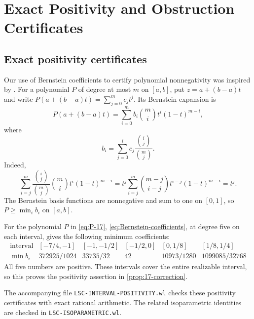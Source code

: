 \section[Positivity and Obstruction Certificates]{Exact Positivity and Obstruction Certificates}
\label{app:exact-certificates}

\subsection{Exact positivity certificates}
\label{subsec:legacy-exact-certificates}

Our use of Bernstein coefficients to certify polynomial nonnegativity
was inspired by \cite[Section~6.3 and Appendix~A]{LienTsai26}.
For a polynomial \(P\) of degree at most \(m\) on \([a,b]\), put
\(z=a+(b-a)t\) and write \(P(a+(b-a)t)=\sum_{j=0}^m c_jt^j\).
Its Bernstein expansion is
\begin{equation}\label{eq:Bernstein-expansion}
 P(a+(b-a)t)=\sum_{i=0}^m b_i\binom mi t^i(1-t)^{m-i},
\end{equation}
where
\begin{equation}\label{eq:Bernstein-coefficients}
 b_i=\sum_{j=0}^i c_j\frac{\binom ij}{\binom mj}.
\end{equation}
Indeed,
\[
 \sum_{i=j}^m\frac{\binom ij}{\binom mj}\binom mi t^i(1-t)^{m-i}
 =t^j\sum_{i=j}^m\binom{m-j}{i-j}t^{i-j}(1-t)^{m-i}=t^j.
\]
The Bernstein basis functions are nonnegative and sum to one on
\([0,1]\), so \(P\geq\min_i b_i\) on \([a,b]\).

\begin{example}
\label{ex:Bernstein-17}
For the polynomial \(P\) in \eqref{eq:P-17}, \eqref{eq:Bernstein-coefficients}, at degree five on each interval,
gives the following minimum coefficients:
\[
\begin{array}{c|ccccc}
 \text{interval}
 &[-7/4,-1]&[-1,-1/2]&[-1/2,0]&[0,1/8]&[1/8,1/4]\\ \hline
 \min b_i
 &372925/1024&33735/32&42&10973/1280&1099085/32768
\end{array}
\]
All five numbers are positive.  These intervals cover the entire
realizable interval, so this proves the positivity assertion in
\cref{prop:17-correction}.
\end{example}

The accompanying file \nolinkurl{LSC-INTERVAL-POSITIVITY.wl} checks these
positivity certificates with exact rational arithmetic. The related
isoparametric identities are checked in \nolinkurl{LSC-ISOPARAMETRIC.wl}.









